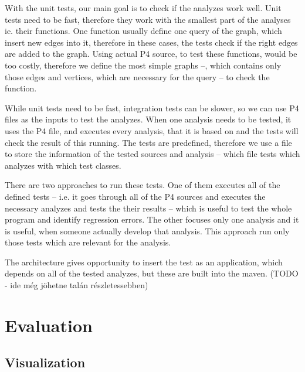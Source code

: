 \documentclass[sigconf]{acmart}
\begin{document}
	With the unit tests, our main goal is to check if the analyzes work well. Unit tests need to be fast, therefore they work with the smallest part of the analyses ie. their functions. One function usually define one query of the graph, which insert new edges into it, therefore in these cases, the tests check if the right edges are added to the graph. Using actual P4 source, to test these functions, would be too costly, therefore we define the most simple graphs --, which contains only those edges and vertices, which are necessary for the query -- to check the function.
	
	While unit tests need to be fast, integration tests can be slower, so we can use P4 files as the inputs to test the analyzes. When one analysis needs to be tested, it uses the P4 file, and executes every analysis, that it is based on and the tests will check the result of this running. The tests are predefined, therefore we use a file to store the information of the tested sources and analysis -- which file tests which analyzes with which test classes.
	
	There are two approaches to run these tests. One of them executes all of the defined tests -- i.e. it goes through all of the P4 sources and executes the necessary analyzes and tests the their results -- which is useful to test the whole program and identify regression errors. The other focuses only one analysis and it is useful, when someone actually develop that analysis. This approach run only those tests which are relevant for the analysis.
	
	The architecture gives opportunity to insert the test as an application, which depends on all of the tested analyzes, but these are built into the maven. (TODO - ide még jöhetne talán részletessebben)
	
	
	
  \section{Evaluation} %
	
	
	\subsection{Visualization} %
\end{document}
